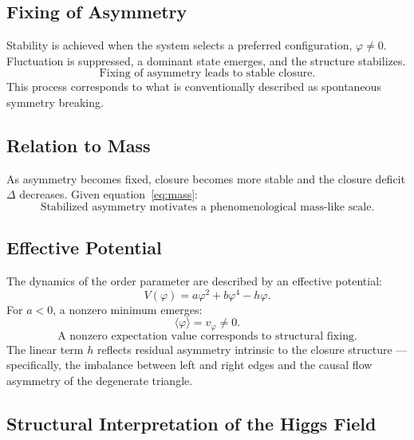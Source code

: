 \subsection{Fixing of Asymmetry}

Stability is achieved when the system selects a preferred configuration,
$\varphi \neq 0$.
Fluctuation is suppressed, a dominant state emerges,
and the structure stabilizes.
\begin{equation}
  \boxed{\text{Fixing of asymmetry leads to stable closure.}}
\end{equation}
This process corresponds to what is conventionally described as
spontaneous symmetry breaking.

\subsection{Relation to Mass}

As asymmetry becomes fixed,
closure becomes more stable and the closure deficit $\Delta$ decreases.
Given equation~\eqref{eq:mass}:
\begin{equation}
  \boxed{
    \text{Stabilized asymmetry motivates a phenomenological mass-like scale.}
  }
\end{equation}

\subsection{Effective Potential}

The dynamics of the order parameter are described by an effective potential:
\begin{equation}
  \label{eq:higgs_potential}
  V(\varphi) = a\varphi^2 + b\varphi^4 - h\varphi.
\end{equation}
For $a < 0$, a nonzero minimum emerges:
\begin{equation}
  \langle\varphi\rangle = v_\varphi \neq 0.
\end{equation}
\begin{equation}
  \boxed{\text{A nonzero expectation value corresponds to structural fixing.}}
\end{equation}
The linear term $h$ reflects residual asymmetry intrinsic to the closure structure ---
specifically, the imbalance between left and right edges
and the causal flow asymmetry of the degenerate triangle.

\subsection{Structural Interpretation of the Higgs Field}


